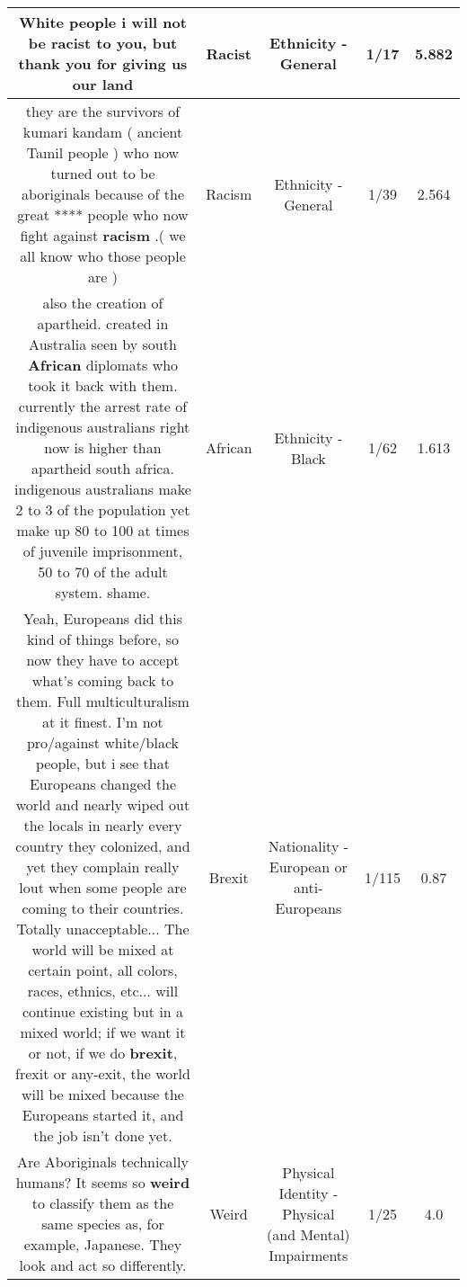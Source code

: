 \documentclass[11pt]{article}
\newlength\mylength
\begin{document}
\begin{center}
\begin{longtable}{|C{.65\mylength}|C{.30\mylength}|C{.12\mylength}|C{.12\mylength}|C{.12\mylength}|}
  \small White people i will not be \textbf{racist} to you, but thank you for giving us our land\normalsize   & Racist & Ethnicity - General & 1/17 & 5.882 \\  \hline
  \small they are the survivors of kumari kandam ( ancient Tamil people )  who now turned out to be aboriginals because of the great **** people who now fight against \textbf{racism} .( we all know who those people are )\normalsize   & Racism & Ethnicity - General & 1/39 & 2.564 \\  \hline
  \small also the creation of apartheid. created in Australia seen by south \textbf{African} diplomats who took it back with them. currently the arrest rate of indigenous australians right now is higher than apartheid south africa. indigenous australians make 2 to 3 of the population yet make up 80 to 100 at times of juvenile imprisonment, 50 to 70 of the adult system. shame.\normalsize   & African & Ethnicity - Black & 1/62 & 1.613 \\  \hline
  \small Yeah, Europeans did this kind of things before, so now they have to accept what's coming back to them. Full multiculturalism at it finest. I'm not pro/against white/black people, but i see that Europeans changed the world and nearly wiped out the locals in nearly every country they colonized, and yet they complain really lout when some people are coming to their countries. Totally unacceptable... The world will be mixed at certain point, all colors, races, ethnics, etc... will continue existing but in a mixed world; if we want it or not, if we do \textbf{brexit}, frexit or any-exit, the world will be mixed because the Europeans started it, and the job isn't done yet.\normalsize   & Brexit & Nationality - European or anti-Europeans & 1/115 & 0.87 \\  \hline
  \small Are Aboriginals technically humans? It seems so \textbf{weird} to classify them as the same species as, for example, Japanese. They look and act so differently.\normalsize   & Weird & Physical Identity - Physical (and Mental) Impairments & 1/25 & 4.0 \\  \hline

\end{longtable}
\end{center}
\end{document}
